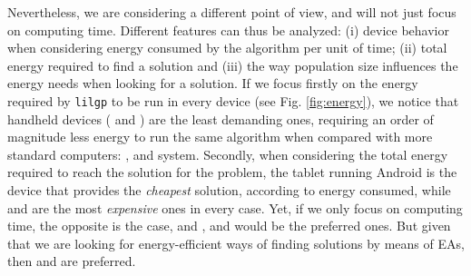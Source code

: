 Nevertheless, we are considering a different point of view, and will
not just focus on computing time.  Different features can thus be
analyzed:  (i) device behavior when considering energy consumed by the
algorithm per unit of time; (ii) total energy required to find a
solution and (iii) the way population size influences the energy needs
when looking for a solution. If we focus firstly on the energy
required by {\tt lilgp} to be run in every device (see
Fig. \ref{fig:energy}), we notice that  handheld devices (\raspberry
and \tabletnsp) are the least demanding ones, requiring an order of
magnitude less energy to run the same algorithm when compared with
more standard computers:  \iMacnsp, \laptop and \blade
system. Secondly, when considering the total energy required to reach
the solution for the problem, the tablet running Android is the device
that provides the \emph{cheapest} solution, according to energy
consumed, while \blade and \laptop are the most \emph{expensive} ones
in every case.  Yet, if we only focus on computing time, the
opposite is the case, and \iMacnsp, \laptop and \blade would be the
preferred ones.  But given that we are looking for energy-efficient
ways of finding solutions by means of EAs, then \raspberry and \tablet
are preferred. 

